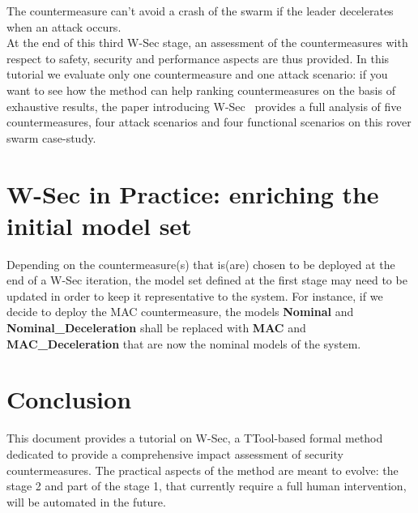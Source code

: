 \documentclass{article}
\begin{document}
The countermeasure can't avoid a crash of the swarm if the leader decelerates when an attack occurs.\\

At the end of this third W-Sec stage, an assessment of the countermeasures with respect to safety, security and performance aspects are thus provided. In this tutorial we evaluate only one countermeasure and one attack scenario: if you want to see how the method can help ranking countermeasures on the basis of exhaustive results, the paper introducing W-Sec~\cite{wsec} provides a full analysis of five countermeasures, four attack scenarios and four functional scenarios on this rover swarm case-study.



\section{W-Sec in Practice: enriching the initial model set}

Depending on the countermeasure(s) that is(are) chosen to be deployed at the end of a W-Sec iteration, the model set defined at the first stage may need to be updated in order to keep it representative to the system. For instance, if we decide to deploy the MAC countermeasure, the models \textbf{Nominal} and \textbf{Nominal\_Deceleration} shall be replaced with \textbf{MAC} and \textbf{MAC\_Deceleration} that are now the nominal models of the system.



\section{Conclusion}

This document provides a tutorial on W-Sec, a TTool-based formal method dedicated to provide a comprehensive impact assessment of security countermeasures. The practical aspects of the method are meant to evolve: the stage 2 and part of the stage 1, that currently require a full human intervention, will be automated in the future.





\end{document}

